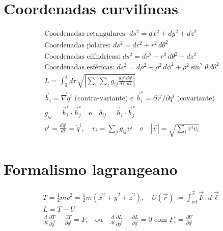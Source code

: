 \documentclass[a4paper,10pt,oneside]{scrartcl}
\begin{document}
	\section*{Coordenadas curvilíneas}
	\begin{gather*}
		\text{Coordenadas retangulares: } ds^2 = dx^2 + dy^2 + dz^2 \\
		\text{Coordenadas polares: } ds^2 = dr^2 + r^2\, d\theta^2 \\
		\text{Coordenadas cilíndricas: } ds^2 = dr^2 + r^2\, d\theta^2 + dz^2 \\
		\text{Coordenadas esféricas: } ds^2 = d\rho^2 + \rho^2 \, d\phi^2 + \rho^2 \sin^2\theta\, d\theta^2 \\
		L = \int_0^\lambda d\tau\, \sqrt{\left|\sum_{i}\sum_{j} g_{ij} \frac{dq^i}{d\tau} \frac{dq^i}{d\tau}\right|} \\
		\vec b_i = \vec\nabla q^i \text{ (contra-variante) e } 
		\vec b_i^{\star} = \partial\vec r/\partial q^i \text{ (covariante)}\\
		g_{ij} = \vec b_i^{\star} \cdot \vec b_j^{\star}
			\quad\text{e}\quad
		\delta_{ij} = \vec b_i \cdot \vec b_j^{\star} \\
		v^i = \frac{dq^i}{dt} = \dot q^i,
			\quad
		v_i = \sum_j g_{ij} v^j
			\quad\text{e}\quad
		|\vec v| = \sqrt{\sum_{i} v^i v_i}
	\end{gather*}

	\section*{Formalismo lagrangeano}
	\begin{gather*}
		T = \frac{1}{2} mv^2 = \frac{1}{2} m \left(\dot x^2 + \dot y^2 + \dot z^2 \right),
			\quad
		U(\vec r) := \int_{\text{ref}}^{\vec r} \vec F \cdot d\vec\ell \\
		L = T - U \\
		\frac{d}{dt}\frac{\partial T}{\partial \dot q^i} - \frac{\partial T}{\partial q^i} = F_i 
			\quad\text{ou}\quad
		\frac{d}{dt}\frac{\partial L}{\partial \dot q^i} - \frac{\partial L}{\partial q^i} = 0
			\text{ com }
		F_i = \frac{\partial U}{\partial q^i}
	\end{gather*}
\end{document}
